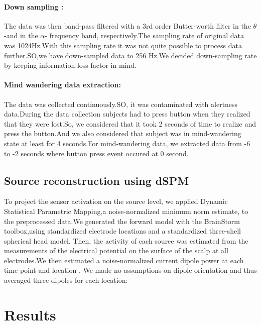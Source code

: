     \paragraph{Down sampling :}
    The data was then band-pass filtered with a 3rd order Butter-worth filter in the $\theta$-and in the $\alpha$- frequency band, respectively.The sampling rate of original data was 1024Hz.With this sampling rate it was not quite possible to process data further.SO,we have down-sampled data to 256 Hz.We decided down-sampling rate  by keeping information loss factor in mind. 
    \paragraph{Mind wandering data extraction:}
    The data was collected continuously.SO, it was contaminated with alertness data.During the data collection subjects had to press button when they realized that they were lost.So, we considered that it took 2 seconds of time to realize and press the button.And we also considered that subject was in mind-wandering state at least for 4 seconds.For mind-wandering data, we extracted data from -6 to -2 seconds where button press event occured at 0 second.

\subsection{Source reconstruction using dSPM}
    To project the sensor activation on the source level, we applied Dynamic Statistical Parametric Mapping,a noise-normalized minimum norm estimate, to the preprocessed data.We generated the forward model with the BrainStorm toolbox,using standardized electrode locations and a standardized three-shell spherical head model. Then, the activity of each source was estimated from the measurements of the electrical potential on the surface of the scalp at all electrodes.We then estimated a noise-normalized current dipole power at each time point and location . We made no assumptions on dipole orientation and thus averaged three dipoles for each location:

\section{Results}

